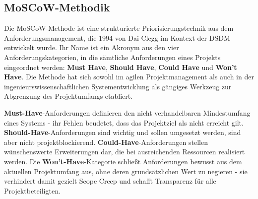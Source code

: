 \subsection{MoSCoW-Methodik}
\label{subsec:Moscow}
Die MoSCoW-Methode ist eine strukturierte Priorisierungstechnik aus dem Anforderungsmanagement, die 1994 von Dai Clegg im Kontext der \ac{DSDM} entwickelt wurde. Ihr Name ist ein Akronym aus den vier Anforderungskategorien, in die sämtliche Anforderungen eines Projekts eingeordnet werden: \textbf{Must Have}, \textbf{Should Have}, \textbf{Could Have} und \textbf{Won't Have}. Die Methode hat sich sowohl im agilen Projektmanagement als auch in der ingenieurswissenschaftlichen Systementwicklung als gängiges Werkzeug zur Abgrenzung des Projektumfangs etabliert.\autocite[vgl.]{kuehnastMoSCoWMethodeEinfachErklaert2024}

\textbf{Must-Have}-Anforderungen definieren den nicht verhandelbaren Mindestumfang eines Systems - ihr Fehlen beudetet, dass das Projektziel als nicht erreicht gilt. \textbf{Should-Have}-Anforderungen sind wichtig und sollen umgesetzt werden, sind aber nicht projektblockierend. \textbf{Could-Have}-Anforderungen stellen wünschenswerte Erweiterungen dar, die bei ausreichenden Ressourcen realisiert werden. Die \textbf{Won't-Have}-Kategorie schließt Anforderungen bewusst aus dem aktuellen Projektumfang aus, ohne deren grundsätzlichen Wert zu negieren - sie verhindert damit gezielt Scope Creep und schafft Transparenz für alle Projektbeteiligten.\autocite[vgl.]{businessMoSCoWPrioritisationDSDM}


